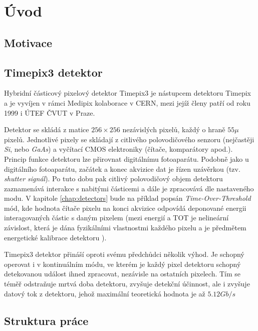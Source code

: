 

\chapter{Úvod}\label{chap01} 
\todo

\section{Motivace}
\todo

\section{Timepix3 detektor}
Hybridní částicový pixelový detektor Timepix3\cite{timepix3} je nástupcem detektoru Timepix\cite{timepix} a je vyvíjen v rámci Medipix kolaborace v CERN, mezi jejíž členy patří od roku 1999 i ÚTEF ČVUT v Praze.

Detektor se skládá z matice $256\times256$ nezávislých pixelů, každý o hraně $55\mu$ pixelů. 
Jednotlivé pixely se skládají z citlivého polovodičového senzoru (nejčastěji \textit{Si}, nebo \textit{GaAs}) a vyčítací CMOS elektroniky (čítače, komparátory apod.). Princip funkce detektoru lze přirovnat digitálnímu fotoaparátu. Podobně jako u digitálního fotoaparátu, začátek a konec akvizice dat je řízen uzávěrkou (tzv. \textit{shutter signál}). Po tuto dobu pak citlivý polovodičový objem detektoru zaznamenává interakce s nabitými částicemi a dále je zpracovává dle nastaveného modu. V kapitole \ref{chap:detectors} bude na příklad popsán \textit{Time-Over-Threshold} mód, kde hodnota čítače pixelu na konci akvizice odpovídá deponované energii interagovaných částic s daným pixelem (mezi energií a TOT je nelineární závislost, která je dána fyzikálními vlastnostmi každého pixelu a je předmětem energetické kalibrace detektoru \cite{Jakubek2011S262}). 

Timepix3 detektor přináší oproti svému předchůdci několik výhod. Je schopný operovat i v kontinuálním módu, ve kterém je každý pixel detektoru schopný detekovanou událost ihned zpracovat, nezávisle na ostatních pixelech. Tím se téměř odstraňuje mrtvá doba detektoru, zvyšuje detekční účinnost, ale i zvyšuje datový tok z detektoru, jehož maximální teoretická hodnota je až $5.12 Gb/s$

\section{Struktura práce}
\todo